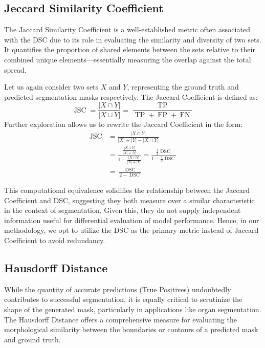 \subsection{Jeccard Similarity Coefficient}

The Jaccard Similarity Coefficient is a well-established metric often associated with the DSC due to its role in evaluating the similarity and diversity of two sets. It quantifies the proportion of shared elements between the sets relative to their combined unique elements—essentially measuring the overlap against the total spread.

Let us again consider two sets \(X\) and \(Y\), representing the ground truth and predicted segmentation masks respectively. The Jaccard Coefficient is defined as:
\[
\operatorname*{JSC} = \frac{|X \cap Y|}{|X\cup Y|} = \frac{\operatorname*{TP}}{\operatorname*{TP} + \operatorname*{FP} + \operatorname*{FN}}
\]
Further exploration allows us to rewrite the Jaccard Coefficient in the form:
\begin{align*}
    \operatorname*{JSC} &= \frac{|X \cap Y|}{|X| + |Y| - |X \cap Y|} \\
    &= \frac{\frac{|X \cap Y|}{|X| + |Y|}}{1 - \frac{|X \cap Y|}{|X| + |Y|}} = \frac{\frac{1}{2}\operatorname*{DSC}}{1 - \frac{1}{2}\operatorname*{DSC}} \\
    &= \frac{\operatorname*{DSC}}{2 - \operatorname*{DSC}}
\end{align*}

This computational equivalence solidifies the relationship between the Jaccard Coefficient and DSC, suggesting they both measure over a similar characteristic in the context of segmentation. Given this, they do not supply independent information useful for differential evaluation of model performance. Hence, in our methodology, we opt to utilize the DSC as the primary metric instead of Jaccard Coefficient to avoid redundancy.

\subsection{Hausdorff Distance}
While the quantity of accurate predictions (True Positives) undoubtedly contributes to successful segmentation, it is equally critical to scrutinize the shape of the generated mask, particularly in applications like organ segmentation. The Hausdorff Distance offers a comprehensive measure for evaluating the morphological similarity between the boundaries or contours of a predicted mask and ground truth.


